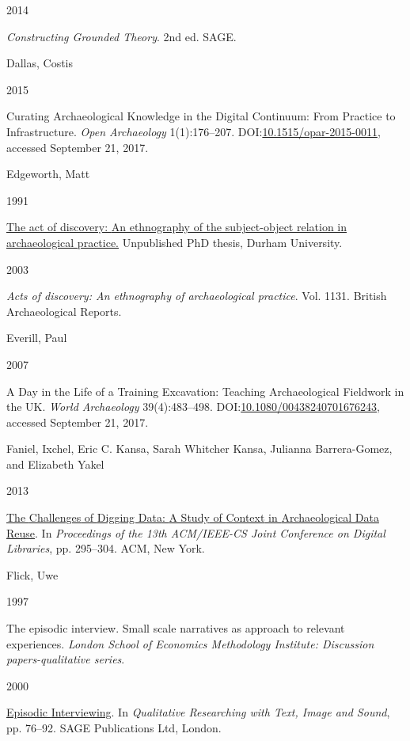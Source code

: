 \documentclass[
]{article}
\newlength{\cslhangindent}
\newlength{\csllabelwidth}
\newenvironment{CSLReferences}[2] %
 {\begin{list}{}{%
  \setlength{\itemindent}{0pt}
  \setlength{\leftmargin}{0pt}
  \setlength{\parsep}{0pt}
  \ifodd #1
   \setlength{\leftmargin}{\cslhangindent}
   \setlength{\itemindent}{-1\cslhangindent}
  \fi
  \setlength{\itemsep}{#2\baselineskip}}}
 {\end{list}}
\newcommand{\CSLBlock}[1]{\hfill\break\parbox[t]{\linewidth}{\strut\ignorespaces#1\strut}}
\newcommand{\CSLLeftMargin}[1]{\parbox[t]{\csllabelwidth}{\strut#1\strut}}
\newcommand{\CSLRightInline}[1]{\parbox[t]{\linewidth - \csllabelwidth}{\strut#1\strut}}
\begin{document}
\begin{CSLReferences}{0}{1}
\CSLLeftMargin{ 2014 }%
\CSLRightInline{\emph{Constructing {Grounded Theory}}. 2nd ed. SAGE.}

\CSLBlock{Dallas, Costis}
\CSLLeftMargin{ 2015}%
\CSLRightInline{Curating {Archaeological Knowledge} in the {Digital
Continuum}: {From Practice} to {Infrastructure}. \emph{Open Archaeology}
1(1):176--207.
DOI:\href{https://doi.org/10.1515/opar-2015-0011}{10.1515/opar-2015-0011},
accessed September 21, 2017.}

\CSLBlock{Edgeworth, Matt}
\CSLLeftMargin{ 1991}%
\CSLRightInline{\href{http://etheses.dur.ac.uk/1481/}{The act of
discovery: {An} ethnography of the subject-object relation in
archaeological practice.} Unpublished PhD thesis, Durham University.}

\CSLLeftMargin{ 2003 }%
\CSLRightInline{\emph{Acts of discovery: {An} ethnography of
archaeological practice}. Vol. 1131. British Archaeological Reports.}

\CSLBlock{Everill, Paul}
\CSLLeftMargin{ 2007}%
\CSLRightInline{A {Day} in the {Life} of a {Training Excavation}:
{Teaching Archaeological Fieldwork} in the {UK}. \emph{World
Archaeology} 39(4):483--498.
DOI:\href{https://doi.org/10.1080/00438240701676243}{10.1080/00438240701676243},
accessed September 21, 2017.}

\CSLBlock{Faniel, Ixchel, Eric C. Kansa, Sarah Whitcher Kansa, Julianna
Barrera-Gomez, and Elizabeth Yakel}
\CSLLeftMargin{ 2013}%
\CSLRightInline{\href{https://doi.org/10.1145/2467696.2467712}{The
{Challenges} of {Digging Data}: {A Study} of {Context} in
{Archaeological Data Reuse}}. In \emph{Proceedings of the 13th
{ACM}/{IEEE-CS Joint Conference} on {Digital Libraries}}, pp. 295--304.
ACM, New York.}

\CSLBlock{Flick, Uwe}
\CSLLeftMargin{ 1997}%
\CSLRightInline{The episodic interview. {Small} scale narratives as
approach to relevant experiences. \emph{London School of Economics
Methodology Institute: Discussion papers-qualitative series}.}

\CSLLeftMargin{ 2000 }%
\CSLRightInline{\href{https://doi.org/10.4135/9781849209731.n5}{Episodic
{Interviewing}}. In \emph{Qualitative {Researching} with {Text}, {Image}
and {Sound}}, pp. 76--92. SAGE Publications Ltd, London.}


\end{CSLReferences}
\end{document}
